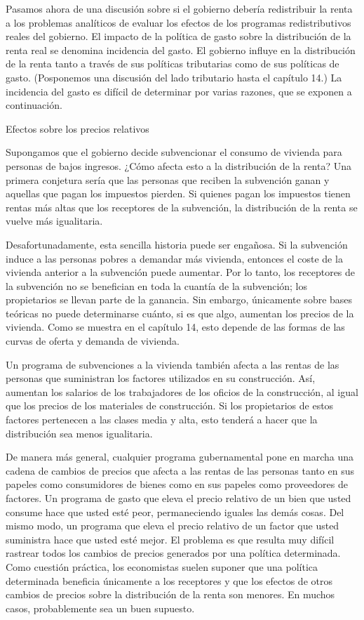 \documentclass[10pt,a4paper]{article}
\begin{document}
Pasamos ahora de una discusión sobre si el gobierno debería redistribuir la renta a los problemas analíticos de evaluar los efectos de los programas redistributivos reales del gobierno. El impacto de la política de gasto sobre la distribución de la renta real se denomina incidencia del gasto. El gobierno influye en la distribución de la renta tanto a través de sus políticas tributarias como de sus políticas de gasto. (Posponemos una discusión del lado tributario hasta el capítulo 14.) La incidencia del gasto es difícil de determinar por varias razones, que se exponen a continuación.

Efectos sobre los precios relativos

Supongamos que el gobierno decide subvencionar el consumo de vivienda para personas de bajos ingresos. ¿Cómo afecta esto a la distribución de la renta? Una primera conjetura sería que las personas que reciben la subvención ganan y aquellas que pagan los impuestos pierden. Si quienes pagan los impuestos tienen rentas más altas que los receptores de la subvención, la distribución de la renta se vuelve más igualitaria.

Desafortunadamente, esta sencilla historia puede ser engañosa. Si la subvención induce a las personas pobres a demandar más vivienda, entonces el coste de la vivienda anterior a la subvención puede aumentar. Por lo tanto, los receptores de la subvención no se benefician en toda la cuantía de la subvención; los propietarios se llevan parte de la ganancia. Sin embargo, únicamente sobre bases teóricas no puede determinarse cuánto, si es que algo, aumentan los precios de la vivienda. Como se muestra en el capítulo 14, esto depende de las formas de las curvas de oferta y demanda de vivienda.

Un programa de subvenciones a la vivienda también afecta a las rentas de las personas que suministran los factores utilizados en su construcción. Así, aumentan los salarios de los trabajadores de los oficios de la construcción, al igual que los precios de los materiales de construcción. Si los propietarios de estos factores pertenecen a las clases media y alta, esto tenderá a hacer que la distribución sea menos igualitaria.

De manera más general, cualquier programa gubernamental pone en marcha una cadena de cambios de precios que afecta a las rentas de las personas tanto en sus papeles como consumidores de bienes como en sus papeles como proveedores de factores. Un programa de gasto que eleva el precio relativo de un bien que usted consume hace que usted esté peor, permaneciendo iguales las demás cosas. Del mismo modo, un programa que eleva el precio relativo de un factor que usted suministra hace que usted esté mejor. El problema es que resulta muy difícil rastrear todos los cambios de precios generados por una política determinada. Como cuestión práctica, los economistas suelen suponer que una política determinada beneficia únicamente a los receptores y que los efectos de otros cambios de precios sobre la distribución de la renta son menores. En muchos casos, probablemente sea un buen supuesto.
\end{document}

